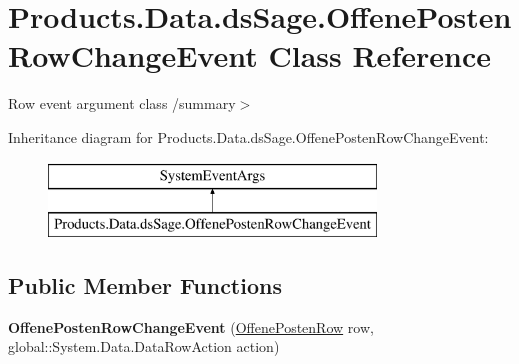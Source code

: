 \hypertarget{class_products_1_1_data_1_1ds_sage_1_1_offene_posten_row_change_event}{}\section{Products.\+Data.\+ds\+Sage.\+Offene\+Posten\+Row\+Change\+Event Class Reference}
\label{class_products_1_1_data_1_1ds_sage_1_1_offene_posten_row_change_event}


Row event argument class /summary$>$  


Inheritance diagram for Products.\+Data.\+ds\+Sage.\+Offene\+Posten\+Row\+Change\+Event\+:\begin{figure}[H]
\begin{center}
\leavevmode
\includegraphics[height=2.000000cm]{class_products_1_1_data_1_1ds_sage_1_1_offene_posten_row_change_event}
\end{center}
\end{figure}
\subsection*{Public Member Functions}
\begin{DoxyCompactItemize}
\item 
{\bfseries Offene\+Posten\+Row\+Change\+Event} (\hyperlink{class_products_1_1_data_1_1ds_sage_1_1_offene_posten_row}{Offene\+Posten\+Row} row, global\+::\+System.\+Data.\+Data\+Row\+Action action)\hypertarget{class_products_1_1_data_1_1ds_sage_1_1_offene_posten_row_change_event_ae7a59c8982f1867e6beb92bf68267dc7}{}\label{class_products_1_1_data_1_1ds_sage_1_1_offene_posten_row_change_event_ae7a59c8982f1867e6beb92bf68267dc7}

\end{DoxyCompactItemize}
